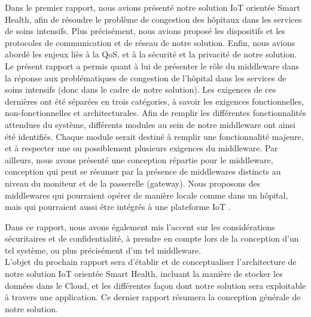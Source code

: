 Dans le premier rapport, nous avions présenté notre solution IoT orientée Smart Health, afin de résoudre le problème de congestion des hôpitaux dans les services de soins intensifs. Plus précisément, nous avions proposé les dispositifs et les protocoles de communication et de réseau de notre solution. Enfin, nous avions abordé les enjeux liès à la QoS, et à la sécurité et la privacité de notre solution.
\\

Le présent rapport a permis quant à lui de présenter le rôle du middleware dans la réponse aux problématiques de congestion de l'hôpital dans les services de soins intensifs (donc dans le cadre de notre solution). Les exigences de ces dernières ont été séparées en trois catégories, à savoir les exigences fonctionnelles, non-fonctionnelles et architecturales. Afin de remplir les différentes fonctionnalités attendues du système, différents modules au sein de notre middleware ont ainsi été identifiés. Chaque module serait destiné à remplir une fonctionnalité majeure, et à respecter une ou possiblement plusieurs exigences du middleware. Par ailleurs, nous avons présenté une conception répartie pour le middleware, conception qui peut se résumer par la présence de middlewares distincts au niveau du moniteur et de la passerelle (gateway). Nous proposons des middlewares qui pourraient opérer de manière locale comme dans un hôpital, mais qui pourraient aussi être intégrés à une plateforme IoT \cite{IBM}.

Dans ce rapport, nous avons également mis l'accent sur les considérations sécuritaires et de confidentialité, à prendre en compte lors de la conception d'un tel système, ou plus précisément d'un tel middleware.
\\

L'objet du prochain rapport sera d'établir et de conceptualiser l'architecture de notre solution IoT orientée Smart Health, incluant la manière de stocker les données dans le Cloud, et les différentes façon dont notre solution sera exploitable à travers une application. Ce dernier rapport résumera la conception générale de notre solution.
